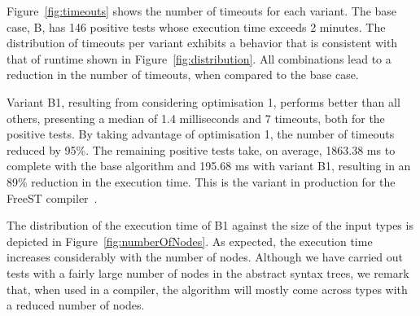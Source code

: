 Figure~\ref{fig:timeouts} shows the number of timeouts for each
variant.  The base case, B, has 146 positive tests whose execution
time exceeds 2 minutes. 
The distribution of timeouts per variant exhibits a behavior that is
consistent with that of runtime shown in
Figure~\ref{fig:distribution}.  All combinations lead to a reduction
in the number of timeouts, when  compared to the base case.


Variant B1, resulting from considering optimisation 1, performs better
than all others, presenting a median of 1.4 milliseconds and 7
timeouts, both for the positive tests. By taking advantage of
optimisation 1, the number of timeouts reduced by 95\%. The remaining
positive tests take, on average, 1863.38 ms to complete with the base
algorithm and 195.68 ms with variant B1, resulting in an 89\%
reduction in the execution time.  This is the variant in production
for the FreeST
compiler~\cite{almeida.etal_freest-functional-language}.

The distribution of the execution time of B1 against the size of the
input types is depicted in Figure~\ref{fig:numberOfNodes}.  As
expected, the execution time increases considerably with the number of
nodes.
%
Although we have carried out tests with a fairly large number of nodes
in the abstract syntax trees, we remark that, when used in a compiler,
the algorithm will mostly come across types with a reduced number of
nodes.

